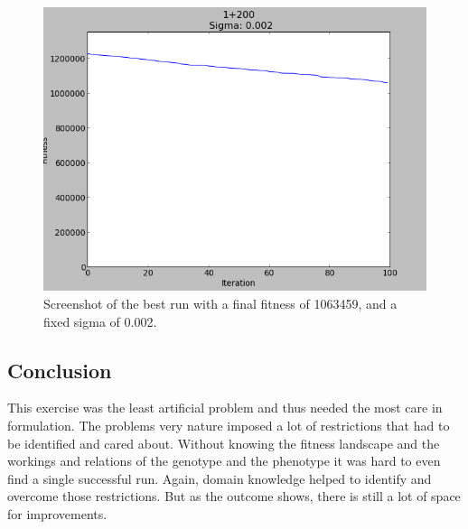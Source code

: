 \documentclass{scrartcl}
\begin{document}
\begin{figure}
 \center
 \includegraphics[width=.5\linewidth]{img/ex4/1063459-1+200-0,002.png}
 \caption{Screenshot of the best run with a final fitness of 1063459, and a fixed sigma of 0.002.}
 \label{fig:vehiclescreenshot}
\end{figure}


\subsection{Conclusion}
This exercise was the least artificial problem and thus needed the most care in formulation. The problems very nature imposed a lot of restrictions that had to be identified and cared about. Without knowing the fitness landscape and the workings and relations of the genotype and the phenotype it was hard to even find a single successful run. Again, domain knowledge helped to identify and overcome those restrictions. But as the outcome shows, there is still a lot of space for improvements.









%







\end{document}
